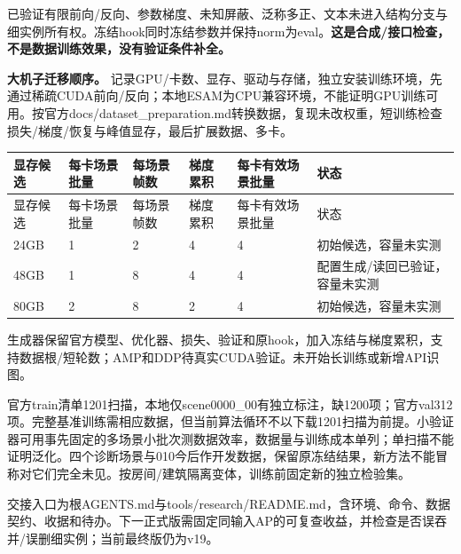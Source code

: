 \documentclass[UTF8,fontset=fandol]{ctexart}
\begin{document}
已验证有限前向/反向、参数梯度、未知屏蔽、泛称多正、文本未进入结构分支与细实例所有权。冻结hook同时冻结参数并保持norm为eval。\textbf{这是合成/接口检查，不是数据训练效果，没有验证条件补全。}



\textbf{大机子迁移顺序。} 记录GPU/卡数、显存、驱动与存储，独立安装训练环境，先通过稀疏CUDA前向/反向；本地ESAM为CPU兼容环境，不能证明GPU训练可用。按官方docs/dataset\_preparation.md转换数据，复现未改权重，短训练检查损失/梯度/恢复与峰值显存，最后扩展数据、多卡。



{\small
\begin{longtable}{|p{}|p{}|p{}|p{}|p{}|p{}|}
\hline
显存候选 & 每卡场景批量 & 每场景帧数 & 梯度累积 & 每卡有效场景批量 & 状态 \\ \hline
\endfirsthead
\hline
显存候选 & 每卡场景批量 & 每场景帧数 & 梯度累积 & 每卡有效场景批量 & 状态 \\ \hline
\endhead
24GB & 1 & 2 & 4 & 4 & 初始候选，容量未实测 \\ \hline
48GB & 1 & 8 & 4 & 4 & 配置生成/读回已验证，容量未实测 \\ \hline
80GB & 2 & 8 & 2 & 4 & 初始候选，容量未实测 \\ \hline
\end{longtable}
}

生成器保留官方模型、优化器、损失、验证和原hook，加入冻结与梯度累积，支持数据根/短轮数；AMP和DDP待真实CUDA验证。未开始长训练或新增API识图。



官方train清单1201扫描，本地仅scene0000\_00有独立标注，缺1200项；官方val312项。完整基准训练需相应数据，但当前算法循环不以下载1201扫描为前提。小验证器可用事先固定的多场景小批次测数据效率，数据量与训练成本单列；单扫描不能证明泛化。四个诊断场景与010今后作开发数据，保留原冻结结果，新方法不能冒称对它们完全未见。按房间/建筑隔离变体，训练前固定新的独立检验集。



交接入口为根AGENTS.md与tools/research/README.md，含环境、命令、数据契约、收据和待办。下一正式版需固定同输入AP的可复查收益，并检查是否误吞并/误删细实例；当前最终版仍为v19。
\end{document}
